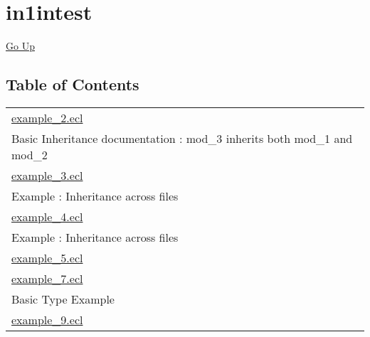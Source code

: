 \chapter*{\color{headtoc} in1intest}
\hypertarget{ecldoc:toc:root/intest/in1intest}{}
\hyperlink{ecldoc:toc:root/intest}{Go Up}


\section*{Table of Contents}
{\renewcommand{\arraystretch}{1.5}
\begin{longtable}{|p{\textwidth}|}
\hline
\hyperlink{ecldoc:toc:intest.in1intest.example_2}{example\_2.ecl} \\
Basic Inheritance documentation : mod\_3 inherits both mod\_1 and mod\_2 \\
\hline
\hyperlink{ecldoc:toc:intest.in1intest.example_3}{example\_3.ecl} \\
Example : Inheritance across files \\
\hline
\hyperlink{ecldoc:toc:intest.in1intest.example_4}{example\_4.ecl} \\
Example : Inheritance across files \\
\hline
\hyperlink{ecldoc:toc:intest.in1intest.example_5}{example\_5.ecl} \\
\hline
\hyperlink{ecldoc:toc:intest.in1intest.example_7}{example\_7.ecl} \\
Basic Type Example \\
\hline
\hyperlink{ecldoc:toc:intest.in1intest.example_9}{example\_9.ecl} \\
\hline
\end{longtable}
}







